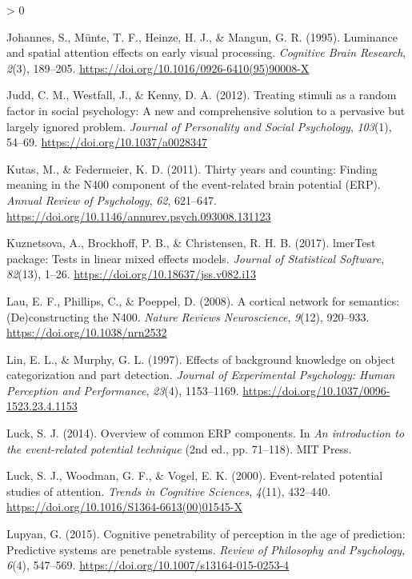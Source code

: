 \documentclass[
  english,
  man,12pt,twoside]{apa7}
\newlength{\cslhangindent}
\newenvironment{CSLReferences}[2] %
 {%
  \setlength{\parindent}{0pt}
  \ifodd #1 \everypar{\setlength{\hangindent}{\cslhangindent}}\ignorespaces\fi
  \ifnum #2 > 0
  \setlength{\parskip}{#2\baselineskip}
  \fi
 }%
 {}
\begin{document}
\begin{CSLReferences}{1}{0}
\leavevmode\hypertarget{ref-johannes1995}{}%
Johannes, S., Münte, T. F., Heinze, H. J., \& Mangun, G. R. (1995). Luminance and spatial attention effects on early visual processing. \emph{Cognitive Brain Research}, \emph{2}(3), 189--205. \url{https://doi.org/10.1016/0926-6410(95)90008-X}

\leavevmode\hypertarget{ref-judd2012}{}%
Judd, C. M., Westfall, J., \& Kenny, D. A. (2012). Treating stimuli as a random factor in social psychology: A new and comprehensive solution to a pervasive but largely ignored problem. \emph{Journal of Personality and Social Psychology}, \emph{103}(1), 54--69. \url{https://doi.org/10.1037/a0028347}

\leavevmode\hypertarget{ref-kutas2011}{}%
Kutas, M., \& Federmeier, K. D. (2011). Thirty years and counting: Finding meaning in the {N400} component of the event-related brain potential ({ERP}). \emph{Annual Review of Psychology}, \emph{62}, 621--647. \url{https://doi.org/10.1146/annurev.psych.093008.131123}

\leavevmode\hypertarget{ref-R-lmerTest}{}%
Kuznetsova, A., Brockhoff, P. B., \& Christensen, R. H. B. (2017). {lmerTest} package: Tests in linear mixed effects models. \emph{Journal of Statistical Software}, \emph{82}(13), 1--26. \url{https://doi.org/10.18637/jss.v082.i13}

\leavevmode\hypertarget{ref-lau2008}{}%
Lau, E. F., Phillips, C., \& Poeppel, D. (2008). A cortical network for semantics: (De)constructing the {N400}. \emph{Nature Reviews Neuroscience}, \emph{9}(12), 920--933. \url{https://doi.org/10.1038/nrn2532}

\leavevmode\hypertarget{ref-lin1997}{}%
Lin, E. L., \& Murphy, G. L. (1997). Effects of background knowledge on object categorization and part detection. \emph{Journal of Experimental Psychology: Human Perception and Performance}, \emph{23}(4), 1153--1169. \url{https://doi.org/10.1037/0096-1523.23.4.1153}

\leavevmode\hypertarget{ref-luck2014}{}%
Luck, S. J. (2014). Overview of common ERP components. In \emph{An introduction to the event-related potential technique} (2nd ed., pp. 71--118). MIT Press.

\leavevmode\hypertarget{ref-luck2000}{}%
Luck, S. J., Woodman, G. F., \& Vogel, E. K. (2000). Event-related potential studies of attention. \emph{Trends in Cognitive Sciences}, \emph{4}(11), 432--440. \url{https://doi.org/10.1016/S1364-6613(00)01545-X}

\leavevmode\hypertarget{ref-lupyan2015}{}%
Lupyan, G. (2015). Cognitive penetrability of perception in the age of prediction: Predictive systems are penetrable systems. \emph{Review of Philosophy and Psychology}, \emph{6}(4), 547--569. \url{https://doi.org/10.1007/s13164-015-0253-4}


\end{CSLReferences}
\end{document}
